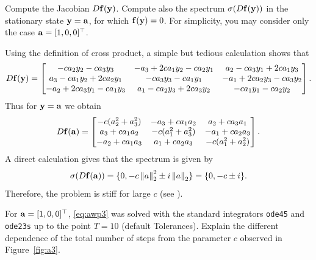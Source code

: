 \begin{problem}
\begin{subproblem}[3]
Compute the Jacobian $D{\mathbf{f}}({\mathbf{y}})$. Compute also the spectrum $\sigma(D{\mathbf{f}}({\mathbf{y}}))$ in the stationary state ${\mathbf{y}}={\mathbf{a}}$, for which ${\mathbf{f}}({\mathbf{y}})=0$. For simplicity, you may consider only the case ${\mathbf{a}}=[1,0,0]^\top$.
\begin{solution}
Using the definition of cross product, a simple but tedious calculation shows that
\[
D{\mathbf{f}}({\mathbf{y}})=
\begin{bmatrix}
-ca_2 y_2  - ca_3 y_3  &  -a_3 +2ca_1y_2 - c a_2 y_1   &    a_2-ca_3 y_1 + 2ca_1 y_3  \\
a_3-ca_1y_2+2ca_2y_1   &   -ca_3y_3-ca_1y_1  &   -a_1+2ca_2y_3-ca_3y_2  \\
-a_2+2ca_3y_1-ca_1y_3  &  a_1 - ca_2y_3 + 2ca_3  y_2  &  -ca_1y_1 - ca_2y_2
\end{bmatrix}
.
\]
Thus for ${\mathbf{y}}={\mathbf{a}}$ we obtain
\[
D{\mathbf{f}}({\mathbf{a}})=
\begin{bmatrix}
-c(a_2^2 + a_3^2)  &  -a_3 +ca_1a_2    &    a_2+ca_3 a_1   \\
a_3+ca_1a_2   &   -c(a_1^2+a_3^2)  &   -a_1+ca_2a_3  \\
-a_2+ca_1a_3  &  a_1 + ca_2a_3   &  -c(a_1^2+a_2^2)
\end{bmatrix}
.
\]
A direct calculation gives that the spectrum is given by
\[
\sigma(D{\mathbf{f}}({\mathbf{a}})) = \{0,-c\left\lVert a \right\rVert_2^2 \pm i \left\lVert a \right\rVert_2\}=\{0,-c \pm i \}.
\]
Therefore, the problem is stiff for large $c$ (see ).
\end{solution}
\end{subproblem}

\begin{subproblem}[2]\label{sp:numofsteps}
For  ${\mathbf{a}}=[1,0,0]^\top$,  \eqref{eq:awp3} was solved with the standard \matlab{} integrators \texttt{ode45} and \texttt{ode23s} up to the point
  $T=10$ (default Tolerances). Explain the different dependence of the total number of steps from the parameter $c$ observed in Figure~\ref{fig:a3}.
  

\end{subproblem}
\end{problem}
